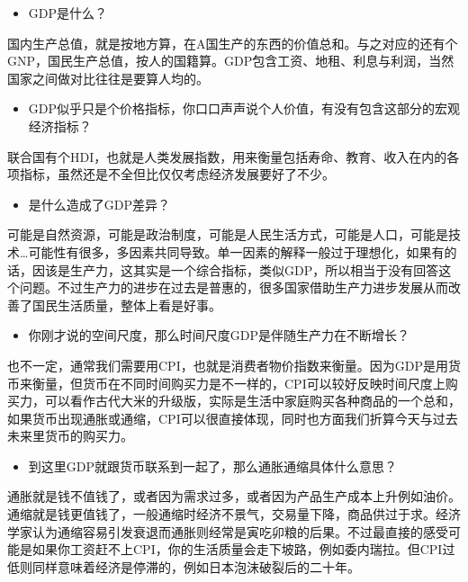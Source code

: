 \documentclass[
  letterpaper,
  DIV=11,
  numbers=noendperiod]{scrreprt}
\providecommand{\tightlist}{%
  \setlength{\itemsep}{0pt}\setlength{\parskip}{0pt}}\usepackage{longtable,booktabs,array}
\begin{document}
\begin{itemize}
\tightlist
\item
  GDP是什么？
\end{itemize}

国内生产总值，就是按地方算，在A国生产的东西的价值总和。与之对应的还有个GNP，国民生产总值，按人的国籍算。GDP包含工资、地租、利息与利润，当然国家之间做对比往往是要算人均的。

\begin{itemize}
\tightlist
\item
  GDP似乎只是个价格指标，你口口声声说个人价值，有没有包含这部分的宏观经济指标？
\end{itemize}

联合国有个HDI，也就是人类发展指数，用来衡量包括寿命、教育、收入在内的各项指标，虽然还是不全但比仅仅考虑经济发展要好了不少。

\begin{itemize}
\tightlist
\item
  是什么造成了GDP差异？
\end{itemize}

可能是自然资源，可能是政治制度，可能是人民生活方式，可能是人口，可能是技术\ldots 可能性有很多，多因素共同导致。单一因素的解释一般过于理想化，如果有的话，因该是生产力，这其实是一个综合指标，类似GDP，所以相当于没有回答这个问题。不过生产力的进步在过去是普惠的，很多国家借助生产力进步发展从而改善了国民生活质量，整体上看是好事。

\begin{itemize}
\tightlist
\item
  你刚才说的空间尺度，那么时间尺度GDP是伴随生产力在不断增长？
\end{itemize}

也不一定，通常我们需要用CPI，也就是消费者物价指数来衡量。因为GDP是用货币来衡量，但货币在不同时间购买力是不一样的，CPI可以较好反映时间尺度上购买力，可以看作古代大米的升级版，实际是生活中家庭购买各种商品的一个总和，如果货币出现通胀或通缩，CPI可以很直接体现，同时也方面我们折算今天与过去未来里货币的购买力。

\begin{itemize}
\tightlist
\item
  到这里GDP就跟货币联系到一起了，那么通胀通缩具体什么意思？
\end{itemize}

通胀就是钱不值钱了，或者因为需求过多，或者因为产品生产成本上升例如油价。通缩就是钱更值钱了，一般通缩时经济不景气，交易量下降，商品供过于求。经济学家认为通缩容易引发衰退而通胀则经常是寅吃卯粮的后果。不过最直接的感受可能是如果你工资赶不上CPI，你的生活质量会走下坡路，例如委内瑞拉。但CPI过低则同样意味着经济是停滞的，例如日本泡沫破裂后的二十年。
\end{document}
